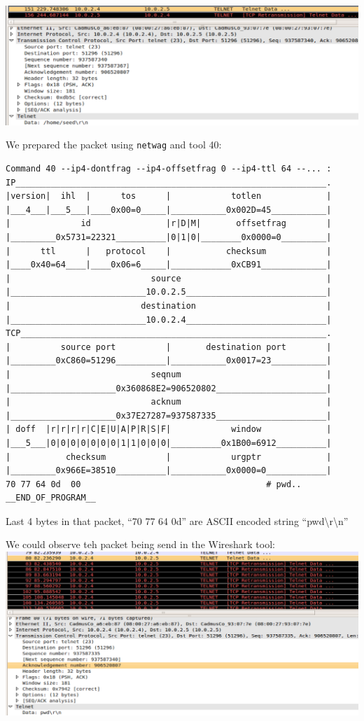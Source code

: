 \documentclass[12pt, a4paper, pdflatex]{article}
\begin{document}
\includegraphics[width=.95\textwidth]{gfx/response.png}

We prepared the packet using \texttt{netwag} and tool 40:\\
\begin{verbatim}
Command 40 --ip4-dontfrag --ip4-offsetfrag 0 --ip4-ttl 64 --... :
IP______________________________________________________________.
|version|  ihl  |      tos      |            totlen             |
|___4___|___5___|____0x00=0_____|___________0x002D=45___________|
|              id               |r|D|M|       offsetfrag        |
|_________0x5731=22321__________|0|1|0|________0x0000=0_________|
|      ttl      |   protocol    |           checksum            |
|____0x40=64____|____0x06=6_____|____________0xCB91_____________|
|                            source                             |
|___________________________10.0.2.5____________________________|
|                          destination                          |
|___________________________10.0.2.4____________________________|
TCP_____________________________________________________________.
|          source port          |       destination port        |
|_________0xC860=51296__________|___________0x0017=23___________|
|                            seqnum                             |
|_____________________0x360868E2=906520802______________________|
|                            acknum                             |
|_____________________0x37E27287=937587335______________________|
| doff  |r|r|r|r|C|E|U|A|P|R|S|F|            window             |
|___5___|0|0|0|0|0|0|0|1|1|0|0|0|__________0x1B00=6912__________|
|           checksum            |            urgptr             |
|_________0x966E=38510__________|___________0x0000=0____________|
70 77 64 0d  00                                     # pwd..
__END_OF_PROGRAM__
\end{verbatim}
Last 4 bytes in that packet, ``70 77 64 0d'' are ASCII encoded string ``pwd\textbackslash r\textbackslash n''


We could observe teh packet being send in the Wireshark tool:\\ \includegraphics[width=.95\textwidth]{gfx/request.png}\\
\end{document}

